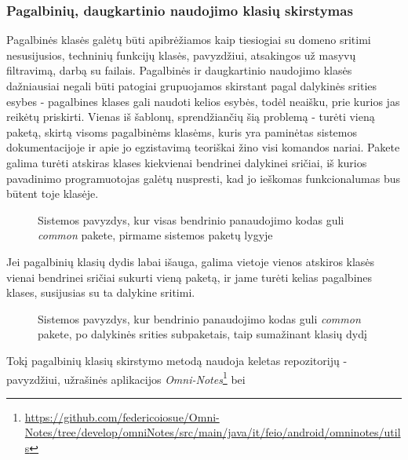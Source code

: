 \subsubsection{Pagalbinių, daugkartinio naudojimo klasių skirstymas}
Pagalbinės klasės galėtų būti apibrėžiamos kaip tiesiogiai su domeno sritimi nesusijusios, techninių funkcijų klasės,
pavyzdžiui, atsakingos už masyvų filtravimą, darbą su failais.
Pagalbinės ir daugkartinio naudojimo klasės dažniausiai negali būti patogiai grupuojamos skirstant pagal dalykinės srities esybes - pagalbines klases gali
naudoti kelios esybės, todėl neaišku, prie kurios jas reikėtų priskirti.
Vienas iš šablonų, sprendžiančių šią problemą - turėti vieną paketą, skirtą visoms pagalbinėms klasėms, kuris yra paminėtas sistemos
dokumentacijoje ir apie jo egzistavimą teoriškai žino visi komandos nariai.
Pakete galima turėti atskiras klases kiekvienai bendrinei dalykinei sričiai, iš kurios pavadinimo programuotojas galėtų nuspresti,
kad jo ieškomas funkcionalumas bus būtent toje klasėje.
\begin{figure}[H]
\snugshade
{}
\endsnugshade
\caption{Sistemos pavyzdys, kur visas bendrinio panaudojimo kodas guli \textit{common} pakete, pirmame sistemos paketų lygyje}
\end{figure}
Jei pagalbinių klasių dydis labai išauga, galima vietoje vienos atskiros klasės vienai bendrinei sričiai sukurti vieną paketą,
ir jame turėti kelias pagalbines klases, susijusias su ta dalykine sritimi.
\begin{figure}[H]
\snugshade
{}
\endsnugshade
\caption{Sistemos pavyzdys, kur bendrinio panaudojimo kodas guli \textit{common} pakete, po dalykinės srities subpaketais, taip sumažinant klasių dydį }
\end{figure}
Tokį pagalbinių klasių skirstymo metodą naudoja keletas repozitorijų - pavyzdžiui, užrašinės aplikacijos \textit{Omni-Notes}\footnote{\url{https://github.com/federicoiosue/Omni-Notes/tree/develop/omniNotes/src/main/java/it/feio/android/omninotes/utils}} bei
